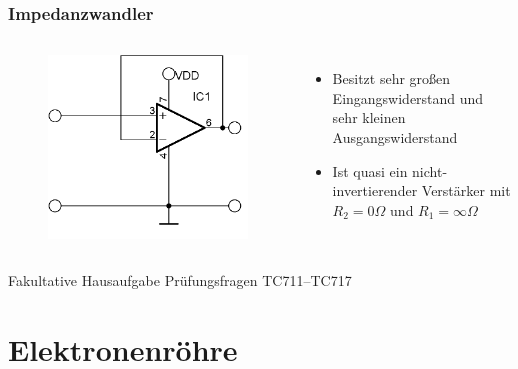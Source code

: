 \begin{frame}
  \frametitle{Impedanzwandler}
  \begin{columns}
    \begin{center}
      \begin{figure}
        \includegraphics[width=\textwidth,height=.85\textheight,keepaspectratio]{a06/Impedanzwandler.png}
      \end{figure}
    \end{center}
    \begin{itemize}
      \item Besitzt sehr großen Eingangswiderstand und sehr kleinen Ausgangswiderstand
      \item Ist quasi ein nicht-invertierender Verstärker mit $R_2 = 0 \Omega$ und $R_1 = \infty\Omega$
    \end{itemize}
  \end{columns}
\end{frame}


\begin{frame}
  \begin{exampleblock}{Fakultative Hausaufgabe}
    Prüfungsfragen TC711--TC717
  \end{exampleblock}
\end{frame}

\section*{Elektronenröhre}

